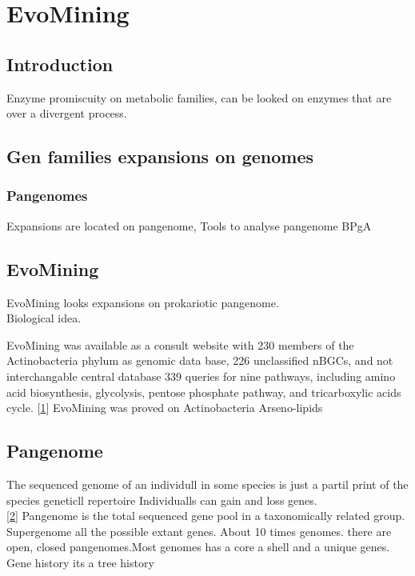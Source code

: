\documentclass[12pt,twoside]{reedthesis}
\begin{document}
  \chapter{EvoMining}\label{rmd-basics}
  
  \section{Introduction}\label{introduction}
  
  Enzyme promiscuity on metabolic families, can be looked on enzymes that
  are over a divergent process.
  
  \section{Gen families expansions on
  genomes}\label{gen-families-expansions-on-genomes}
  
  \subsection{Pangenomes}\label{pangenomes}
  
  Expansions are located on pangenome, Tools to analyse pangenome BPgA
  
  \section{EvoMining}\label{evomining}
  
  EvoMining looks expansions on prokariotic pangenome.\\
  Biological idea.
  
  EvoMining was available as a consult website with 230 members of the
  Actinobacteria phylum as genomic data base, 226 unclassified nBGCs, and
  not interchangable central database 339 queries for nine pathways,
  including amino acid biosynthesis, glycolysis, pentose phosphate
  pathway, and tricarboxylic acids cycle.
  {[}\protect\hyperlink{ref-cruz-morales_phylogenomic_2016}{1}{]}
  EvoMining was proved on Actinobacteria Arseno-lipids
  
  \section{Pangenome}\label{pangenome}
  
  The sequenced genome of an individull in some species is just a partil
  print of the species geneticll repertoire Individualls can gain and loss
  genes.\\
  {[}\protect\hyperlink{ref-koonin_turbulent_2015}{2}{]} Pangenome is the
  total sequenced gene pool in a taxonomically related group. Supergenome
  all the possible extant genes. About 10 times genomes. there are open,
  closed pangenomes.Most genomes has a core a shell and a unique genes.\\
  Gene history its a tree history
  
\end{document}
